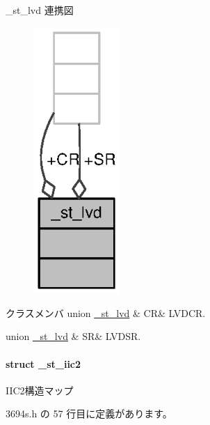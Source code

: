 \+\_\+st\+\_\+lvd 連携図
\nopagebreak
\begin{figure}[H]
\begin{center}
\leavevmode
\includegraphics[width=93pt]{da/dbb/struct__st__lvd__coll__graph}
\end{center}
\end{figure}
\begin{DoxyFields}{クラスメンバ}
union \hyperlink{3694s_8h_de/d14/union__st__lvd_8CR}{\+\_\+st\+\_\+lvd}\label{3694s_8h_ac8febeca1884130a767e80182880e3e4}
&
C\+R&
L\+V\+D\+C\+R. \\
\hline

union \hyperlink{3694s_8h_d3/d55/union__st__lvd_8SR}{\+\_\+st\+\_\+lvd}\label{3694s_8h_a2c6a03a958e6362834221d1b2a8080af}
&
S\+R&
L\+V\+D\+S\+R. \\
\hline

\end{DoxyFields}
\label{struct__st__iic2}
\paragraph{struct \+\_\+st\+\_\+iic2}
I\+I\+C2構造マップ 

 3694s.\+h の 57 行目に定義があります。



